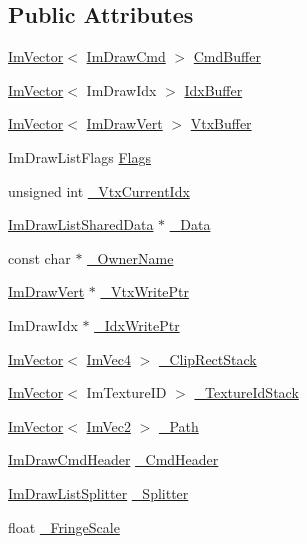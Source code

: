 \subsection*{Public Attributes}
\begin{DoxyCompactItemize}
\item 
\hyperlink{structImVector}{Im\+Vector}$<$ \hyperlink{structImDrawCmd}{Im\+Draw\+Cmd} $>$ \hyperlink{structImDrawList_a67a4b5cc4c83bc3b81d96c46cbd38a07}{Cmd\+Buffer}
\item 
\hyperlink{structImVector}{Im\+Vector}$<$ Im\+Draw\+Idx $>$ \hyperlink{structImDrawList_adf292ff70a954d82daf061c609e75dfc}{Idx\+Buffer}
\item 
\hyperlink{structImVector}{Im\+Vector}$<$ \hyperlink{structImDrawVert}{Im\+Draw\+Vert} $>$ \hyperlink{structImDrawList_aa8ff4aee39cf3c3791b7e29a7b4264be}{Vtx\+Buffer}
\item 
Im\+Draw\+List\+Flags \hyperlink{structImDrawList_ada2c004661663ef875f4d4c7ec0b4557}{Flags}
\item 
unsigned int \hyperlink{structImDrawList_a2228793183665bc3d8612795555fe505}{\+\_\+\+Vtx\+Current\+Idx}
\item 
\hyperlink{structImDrawListSharedData}{Im\+Draw\+List\+Shared\+Data} $\ast$ \hyperlink{structImDrawList_ad5a67c6f1487a812410e9979d1cf4a02}{\+\_\+\+Data}
\item 
const char $\ast$ \hyperlink{structImDrawList_a643f385fb9d5fc35a431e72a10a212f5}{\+\_\+\+Owner\+Name}
\item 
\hyperlink{structImDrawVert}{Im\+Draw\+Vert} $\ast$ \hyperlink{structImDrawList_a67f870f5140bf1cab14b8515b7386073}{\+\_\+\+Vtx\+Write\+Ptr}
\item 
Im\+Draw\+Idx $\ast$ \hyperlink{structImDrawList_a771f4c7f71873852fe030c3e498e5843}{\+\_\+\+Idx\+Write\+Ptr}
\item 
\hyperlink{structImVector}{Im\+Vector}$<$ \hyperlink{structImVec4}{Im\+Vec4} $>$ \hyperlink{structImDrawList_ae950024f053f3c94dc2c763d20be609d}{\+\_\+\+Clip\+Rect\+Stack}
\item 
\hyperlink{structImVector}{Im\+Vector}$<$ Im\+Texture\+ID $>$ \hyperlink{structImDrawList_a848faddd121da050214b8d8159e5e704}{\+\_\+\+Texture\+Id\+Stack}
\item 
\hyperlink{structImVector}{Im\+Vector}$<$ \hyperlink{structImVec2}{Im\+Vec2} $>$ \hyperlink{structImDrawList_a5bdc39abf351360500048628b8dc1b07}{\+\_\+\+Path}
\item 
\hyperlink{structImDrawCmdHeader}{Im\+Draw\+Cmd\+Header} \hyperlink{structImDrawList_a87d1ec89ec6a742fd4d097d2b924e92b}{\+\_\+\+Cmd\+Header}
\item 
\hyperlink{structImDrawListSplitter}{Im\+Draw\+List\+Splitter} \hyperlink{structImDrawList_a2893207705100e8a5da8122da56bd162}{\+\_\+\+Splitter}
\item 
float \hyperlink{structImDrawList_aa667eca45099e5679b161c17ac6ec7e0}{\+\_\+\+Fringe\+Scale}
\end{DoxyCompactItemize}


